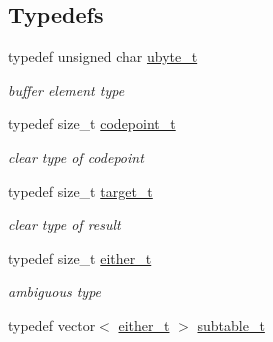 \subsection*{Typedefs}
\begin{DoxyCompactItemize}
\item 
\hypertarget{namespacejlettvin_a7c7cf84f4fd67858c46a1077ed2e3ad4}{}typedef unsigned char \hyperlink{namespacejlettvin_a7c7cf84f4fd67858c46a1077ed2e3ad4}{ubyte\+\_\+t}\label{namespacejlettvin_a7c7cf84f4fd67858c46a1077ed2e3ad4}

\begin{DoxyCompactList}\small\item\em buffer element type \end{DoxyCompactList}\item 
\hypertarget{namespacejlettvin_a5c480560edc7a71c9f5ae6dad14e6fec}{}typedef size\+\_\+t \hyperlink{namespacejlettvin_a5c480560edc7a71c9f5ae6dad14e6fec}{codepoint\+\_\+t}\label{namespacejlettvin_a5c480560edc7a71c9f5ae6dad14e6fec}

\begin{DoxyCompactList}\small\item\em clear type of codepoint \end{DoxyCompactList}\item 
\hypertarget{namespacejlettvin_ac925326f2732a65f4e3caaea182401a9}{}typedef size\+\_\+t \hyperlink{namespacejlettvin_ac925326f2732a65f4e3caaea182401a9}{target\+\_\+t}\label{namespacejlettvin_ac925326f2732a65f4e3caaea182401a9}

\begin{DoxyCompactList}\small\item\em clear type of result \end{DoxyCompactList}\item 
\hypertarget{namespacejlettvin_af3d2e8320ecb86b316e2069e9de6e8f2}{}typedef size\+\_\+t \hyperlink{namespacejlettvin_af3d2e8320ecb86b316e2069e9de6e8f2}{either\+\_\+t}\label{namespacejlettvin_af3d2e8320ecb86b316e2069e9de6e8f2}

\begin{DoxyCompactList}\small\item\em ambiguous type \end{DoxyCompactList}\item 
\hypertarget{namespacejlettvin_a7133ba660d288e5f368d7285843739c8}{}typedef vector$<$ \hyperlink{namespacejlettvin_af3d2e8320ecb86b316e2069e9de6e8f2}{either\+\_\+t} $>$ \hyperlink{namespacejlettvin_a7133ba660d288e5f368d7285843739c8}{subtable\+\_\+t}\label{namespacejlettvin_a7133ba660d288e5f368d7285843739c8}


\end{DoxyCompactItemize}
